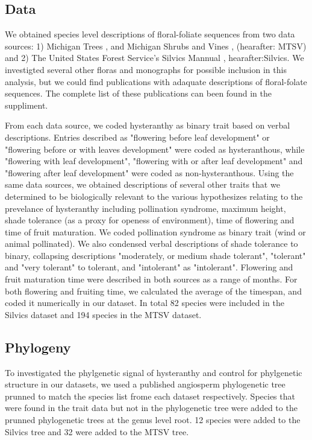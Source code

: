 \documentclass{article}\usepackage[]{graphicx}\usepackage[]{color}
\begin{document}
\subsection*{Data}
We obtained species level descriptions of floral-foliate sequences from two data sources: 1) Michigan Trees \citep{Barnes}, and Michigan Shrubs and Vines \citep{Barnes}, (hearafter: MTSV) and 2) The United States Forest Service's Silvics Mannual \citep{}, hearafter:Silvics. We investigted several other floras and monographs for possible inclusion in this analysis, but we could find publications with adaquate descriptions of floral-folate sequences. The complete list of these publications can been found in the suppliment.
\par From each data source, we coded hysteranthy as binary trait based on verbal descriptions. Entries described as "flowering before leaf development" or "flowering before or with leaves development" were coded as hysteranthous, while "flowering with leaf development", "flowering with or after leaf development" and "flowering after leaf development" were coded as non-hysteranthous. Using the same data sources, we obtained descriptions of several other traits that we determined to be biologically relevant to the various hypothesizes relating to the prevelance of hysteranthy including pollination syndrome, maximum height, shade tolerance (as a proxy for openess of environment), time of flowering and time of fruit maturation. We coded pollination syndrome as binary trait (wind or animal pollinated). We also condensed verbal descriptions of shade tolerance to binary, collapsing descriptions "moderately, or medium shade tolerant", "tolerant" and "very tolerant" to tolerant, and  "intolerant" as "intolerant". Flowering and fruit maturation time were described in both sources as a range of months. For both flowering and fruiting time, we calculated the average of the timespan, and coded it numerically in our dataset.  In total 82 species were included in the Silvics dataset and 194 species in the MTSV dataset.
\subsection*{Phylogeny}
To investigated the phylgenetic signal of hysteranthy and control for phylgenetic structure in our datasets, we used a published angiosperm phylogenetic tree \citep{Zanne2014} prunned to match the species list frome each dataset respectively. Species that were found in the trait data but not in the phylogenetic tree were added to the prunned phylogenetic trees at the genus level root. 12 species were added to the Silvics tree and 32 were added to the MTSV tree.
\end{document}
